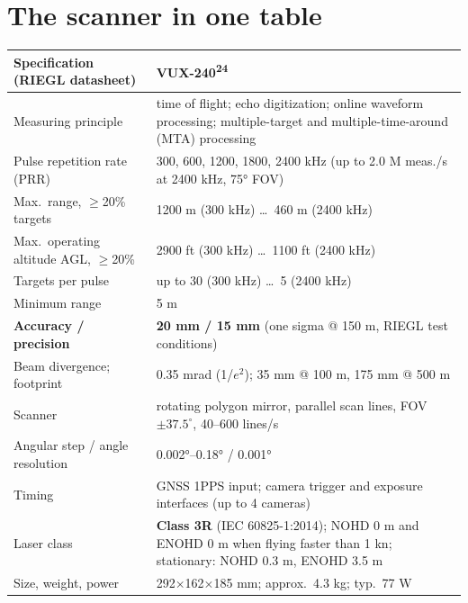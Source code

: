 \section{The scanner in one table}
\begin{center}\small
\renewcommand{\arraystretch}{1.18}
\begin{tabularx}{\linewidth}{>{\raggedright\arraybackslash}p{4.8cm}X}\toprule
\textbf{Specification (RIEGL datasheet)} & \textbf{VUX-240\textsuperscript{24}}\\\midrule
Measuring principle & time of flight; echo digitization; online waveform processing; multiple-target and multiple-time-around (MTA) processing\\
Pulse repetition rate (PRR) & 300, 600, 1200, 1800, 2400 kHz (up to 2.0 M meas./s at 2400 kHz, 75° FOV)\\
Max.\ range, $\ge$20\% targets & 1200 m (300 kHz) \ldots\ 460 m (2400 kHz)\\
Max.\ operating altitude AGL, $\ge$20\% & 2900 ft (300 kHz) \ldots\ 1100 ft (2400 kHz)\\
Targets per pulse & up to 30 (300 kHz) \ldots\ 5 (2400 kHz)\\
Minimum range & 5 m\\
\textbf{Accuracy / precision} & \textbf{20 mm / 15 mm} (one sigma @ 150 m, RIEGL test conditions)\\
Beam divergence; footprint & 0.35 mrad (1/$e^2$); 35 mm @ 100 m, 175 mm @ 500 m\\
Scanner & rotating polygon mirror, parallel scan lines, FOV $\pm37.5^\circ$, 40--600 lines/s\\
Angular step / angle resolution & 0.002°--0.18° / 0.001°\\
Timing & GNSS 1PPS input; camera trigger and exposure interfaces (up to 4 cameras)\\
Laser class & \textbf{Class 3R} (IEC 60825-1:2014); NOHD 0 m and ENOHD 0 m when flying faster than 1 kn; stationary: NOHD 0.3 m, ENOHD 3.5 m\\
Size, weight, power & 292$\times$162$\times$185 mm; approx.\ 4.3 kg; typ.\ 77 W\\\bottomrule
\end{tabularx}\end{center}

